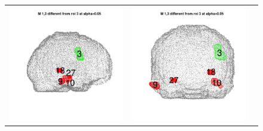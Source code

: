 \documentclass[12pt]{article}
\begin{document}
\begin{figure}[h]
\begin{tabular}{ccc}
\includegraphics[scale = 0.24]{../a7plots/d_3r_3_view1.png} & 
\includegraphics[scale = 0.24]{../a7plots/d_3r_3_view2.png} & 

\end{tabular}
\end{figure}
\end{document}
